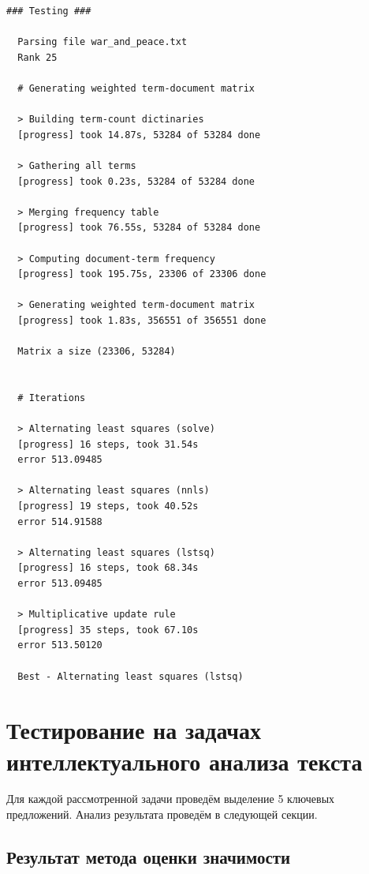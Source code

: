 \begin{lstlisting}[caption=Затраты по времени на выполнение алгоритмов]
  ### Testing ###

  Parsing file war_and_peace.txt
  Rank 25

  # Generating weighted term-document matrix

  > Building term-count dictinaries
  [progress] took 14.87s, 53284 of 53284 done

  > Gathering all terms
  [progress] took 0.23s, 53284 of 53284 done

  > Merging frequency table
  [progress] took 76.55s, 53284 of 53284 done

  > Computing document-term frequency
  [progress] took 195.75s, 23306 of 23306 done

  > Generating weighted term-document matrix
  [progress] took 1.83s, 356551 of 356551 done

  Matrix a size (23306, 53284)


  # Iterations

  > Alternating least squares (solve)
  [progress] 16 steps, took 31.54s
  error 513.09485

  > Alternating least squares (nnls)
  [progress] 19 steps, took 40.52s
  error 514.91588

  > Alternating least squares (lstsq)
  [progress] 16 steps, took 68.34s
  error 513.09485

  > Multiplicative update rule
  [progress] 35 steps, took 67.10s
  error 513.50120

  Best - Alternating least squares (lstsq)
\end{lstlisting}




\newpage





\section{Тестирование на задачах интеллектуального анализа текста}

Для каждой рассмотренной задачи проведём выделение 5 ключевых предложений.
Анализ результата проведём в следующей секции.


\subsection{Результат метода оценки значимости}

